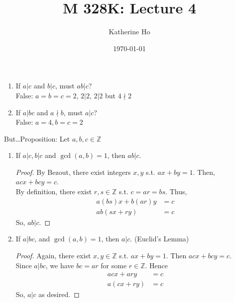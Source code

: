 \documentclass[letterpaper]{article}
\title{M 328K: Lecture 4}
\author{Katherine Ho}
\date\today
\begin{document}
\maketitle

\section{}
    \begin{enumerate}
        \item If $a|c$ and $b|c$, must $ab|c$? \\
        False: $a=b=c=2$, $2|2$, $2|2$ but $4\nmid 2$ 
        \item If $a|bc$ and $a\nmid b$, must $a|c$? \\
        False: $a=4, b=c=2$
    \end{enumerate}
    
    But\dots Proposition: Let $a,b,c\in\mathbb{Z}$
    \begin{enumerate}
        \item If $a|c, b|c$ and $\gcd(a,b)=1$, then $ab|c$.
        \begin{proof}
            By Bezout, there exist integers $x,y$ s.t. $ax+by=1$. 
            Then, $acx+bcy = c$. \\
            By definition, there exist $r,s\in\mathbb{Z}$ s.t. $c=ar=bs$. 
            Thus, 
            \begin{align*}
                a(bs)x + b(ar)y &= c \\
                ab(sx+ry) &= c
            \end{align*}
            So, $ab|c$.
        \end{proof}

        \item If $a|bc$, and $\gcd(a,b)=1$, then $a|c$. (Euclid's Lemma)
        \begin{proof}
            Again, there exist $x,y\in\mathbb{Z}$ s.t. $ax+by=1$.
            Then $acx+bcy=c$. \\
            Since $a|bc$, we have $bc=ar$ for some $r\in\mathbb{Z}$.
            Hence 
            \begin{align*}
                acx+ary &= c \\
                a(cx+ry) &= c
            \end{align*}
            So, $a|c$ as desired.
        \end{proof}
        
    \end{enumerate}
\end{document}
